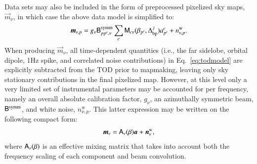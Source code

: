 \documentclass{aa}
\def\,{\thinspace}
\newcommand{\A}[0]{\tens{A}}
\newcommand{\n}[0]{\vec{n}}
\renewcommand{\a}[0]{\vec{a}}
\newcommand{\m}[0]{\vec{m}}
\newcommand{\B}[0]{\tens{B}}
\newcommand{\M}[0]{\tens{M}}
\newcommand{\Dbp}[0]{\Delta_{\mathrm{bp}}}
\begin{document}
Data sets may also be included in the form of
preprocessed pixelized sky maps, $\m_{\nu}$, in which case the above
data model is simplified to:
\begin{equation}
  \m_{\nu,p} = g_{\nu}\B^{\mathrm{symm}}_{pp',\nu}\sum_{c}
    \M_{c\nu}(\beta_{p'}, \Dbp^{j})a^c_{p'} + n^{\mathrm{w}}_{\nu,p}.
  \label{eq:mapmodel}
\end{equation}
When producing $\m_{\nu}$, all time-dependent quantities (i.e., the
far sidelobe, orbital dipole, 1\,Hz spike, and correlated noise
contributions) in Eq.~\eqref{eq:todmodel} are explicitly subtracted
from the TOD prior to mapmaking, leaving only sky stationary
contributions in the final pixelized map. However, at this level only
a very limited set of instrumental parameters may be accounted for per
frequency, namely an overall absolute calibration factor, $g_{\nu}$,
an azimuthally symmetric beam, $\B^{\mathrm{symm}}$, and white noise,
$n^{\mathrm{w}}_{\nu,p}$. This latter expression may be written on the
following compact form:
\begin{equation}
  \m_{\nu} = \A_{\nu}(\beta)\a +\n^{\mathrm{w}}_{\nu},
  \label{eq:binned_map}
\end{equation}
where $\A_{\nu}(\beta)$ is an effective mixing matrix that takes into
account both the frequency scaling of each component and beam
convolution.
\end{document}
